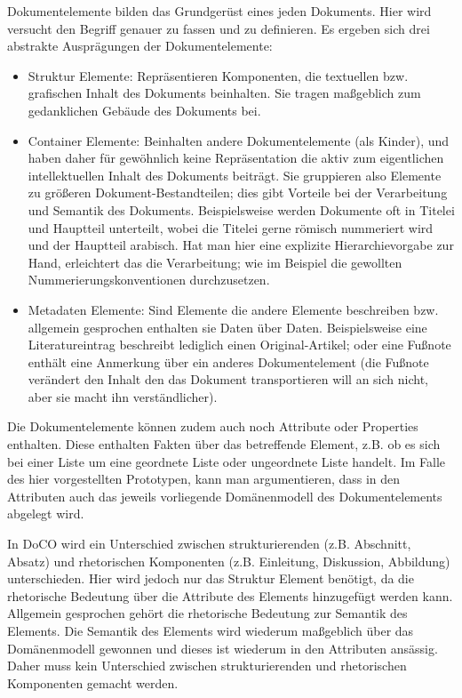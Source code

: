 Dokumentelemente bilden das Grundgerüst eines jeden Dokuments. Hier wird versucht den Begriff genauer zu fassen und zu definieren. Es ergeben sich drei abstrakte Ausprägungen der Dokumentelemente:

 
\begin{itemize}

\item Struktur Elemente: Repräsentieren Komponenten, die textuellen bzw. grafischen Inhalt des Dokuments beinhalten. Sie tragen maßgeblich zum gedanklichen Gebäude des Dokuments bei.
\item Container Elemente: Beinhalten andere Dokumentelemente (als Kinder), und haben daher für gewöhnlich keine Repräsentation die aktiv zum eigentlichen intellektuellen Inhalt des Dokuments beiträgt. Sie gruppieren also Elemente zu größeren Dokument-Bestandteilen; dies gibt Vorteile bei der Verarbeitung und Semantik des Dokuments. Beispielsweise werden Dokumente oft in Titelei und Hauptteil unterteilt, wobei die Titelei gerne römisch nummeriert wird und der Hauptteil arabisch. Hat man hier eine explizite Hierarchievorgabe zur Hand, erleichtert das die Verarbeitung; wie im Beispiel die gewollten Nummerierungskonventionen durchzusetzen.
\item Metadaten Elemente: Sind Elemente die andere Elemente beschreiben bzw. allgemein gesprochen enthalten sie Daten über Daten. Beispielsweise eine Literatureintrag beschreibt lediglich einen Original-Artikel; oder eine Fußnote enthält eine Anmerkung über ein anderes Dokumentelement (die Fußnote verändert den Inhalt den das Dokument transportieren will an sich nicht, aber sie macht ihn verständlicher).
\end{itemize}
 
Die Dokumentelemente können zudem auch noch Attribute oder Properties enthalten. Diese enthalten Fakten über das betreffende Element, z.B. ob es sich bei einer Liste um eine geordnete Liste oder ungeordnete Liste handelt. Im Falle des hier vorgestellten Prototypen, kann man argumentieren, dass in den Attributen auch das jeweils vorliegende Domänenmodell des Dokumentelements abgelegt wird.

 
In DoCO wird ein Unterschied zwischen strukturierenden (z.B. Abschnitt, Absatz) und rhetorischen Komponenten (z.B. Einleitung, Diskussion, Abbildung) unterschieden. Hier wird jedoch nur das Struktur Element benötigt, da die rhetorische Bedeutung über die Attribute des Elements hinzugefügt werden kann. Allgemein gesprochen gehört die rhetorische Bedeutung zur Semantik des Elements. Die Semantik des Elements wird wiederum maßgeblich über das Domänenmodell gewonnen und dieses ist wiederum in den Attributen ansässig. Daher muss kein Unterschied zwischen strukturierenden und rhetorischen Komponenten gemacht werden.


